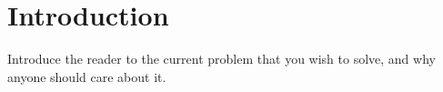 \chapter{Introduction}\label{CH_Intro}

Introduce the reader to the current problem that you wish to
solve, and why anyone should care about it.
